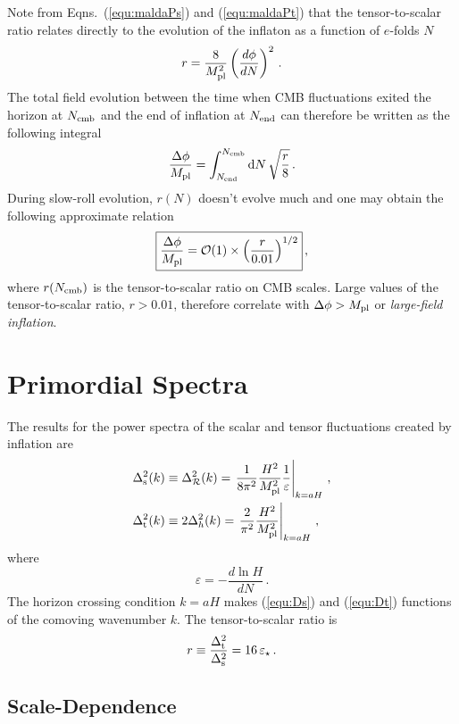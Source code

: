 \documentclass[12pt,letterpaper,rotate]{article}
\def\beq{\begin{equation}}
\def\eeq{\end{equation}}
\def\Mp{M_{\rm pl}}
\def\d{{\rm d}}
\def\R{{\cal R}}
\begin{document}
{Note from Eqns.~(\ref{equ:maldaPs}) and (\ref{equ:maldaPt}) that the tensor-to-scalar ratio relates directly to the evolution of the inflaton as a function of $e$-folds $N$
\beq
r = \frac{8}{\Mp^2} \left(\frac{d \phi}{d N}\right)^2\, .
\eeq
The total field evolution between the time when CMB fluctuations exited the horizon at $N_{\rm cmb}$ and the end of inflation at $N_{\rm end}$ can therefore be written as the following integral
\beq
\frac{\Delta \phi}{\Mp} = \int_{N_{\rm end}}^{N_{\rm cmb}} \d N\, \sqrt{\frac{r}{8}} \, .
\eeq
During slow-roll evolution, $r(N)$ doesn't evolve much and one may obtain the following approximate relation \cite{Lyth}
\beq
\fbox{$\displaystyle
\frac{\Delta \phi}{\Mp} = {\cal O}(1) \times \left( \frac{r}{0.01}\right)^{1/2} $}\, ,
\eeq
where $r(N_{\rm cmb})$ is the tensor-to-scalar ratio on CMB scales.
Large values of the tensor-to-scalar ratio, $r > 0.01$, therefore correlate with $\Delta \phi > \Mp$ or {\it large-field inflation}.

\section{Primordial Spectra} %



The results for the power spectra of the scalar and tensor fluctuations created by inflation are
\begin{align}
\label{equ:Ds}
\Delta^2_{\rm s}(k)  &\equiv \Delta^2_\R(k)= \left. \frac{1}{8\pi^2} \frac{H^2}{\Mp^2} \frac{1}{\varepsilon} \right|_{k=aH} \, , \\
\label{equ:Dt}
\Delta^2_{\rm t}(k) & \equiv 2 \Delta^2_h(k) = \left. \frac{2}{\pi^2} \frac{H^2}{\Mp^2} \right|_{k=aH} \, ,
\end{align}
where %
\beq
\varepsilon = - \frac{d \ln H}{d N} \, .
\eeq
The horizon crossing condition $k=aH$ makes (\ref{equ:Ds}) and (\ref{equ:Dt}) functions of the comoving wavenumber $k$.
The tensor-to-scalar ratio is
\beq
r \equiv \frac{\Delta_{\rm t}^2}{\Delta^2_{\rm s}} =  16\, \varepsilon_\star \, .
\eeq



\subsection{Scale-Dependence}

}
\end{document}

